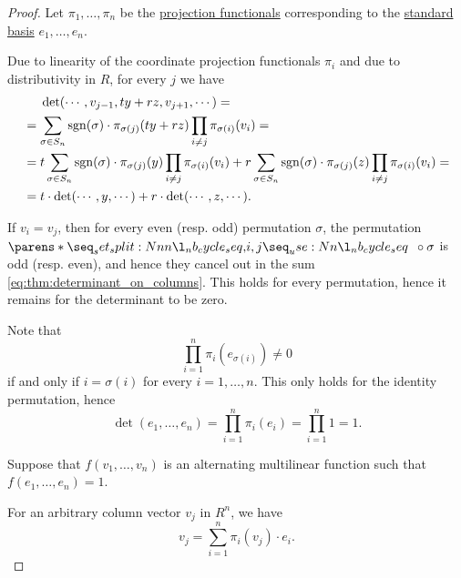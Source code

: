\begin{proof}
  Let \( \pi_1, \ldots, \pi_n \) be the \hyperref[def:basis_decomposition]{projection functionals} corresponding to the \hyperref[def:sequence_space]{standard basis} \( e_1, \ldots, e_n \).

   Due to linearity of the coordinate projection functionals \( \pi_i \) and due to distributivity in \( R \), for every \( j \) we have
  \begin{align*}
    &\phantom{{}={}}
    \det(\cdots, v_{j-1}, ty + rz, v_{j+1}, \cdots)
    = \\ &=
    \sum_{\sigma \in S_n} \sgn(\sigma) \cdot \pi_{\sigma(j)} (ty + rz) \prod_{i \neq j} \pi_{\sigma(i)} (v_i)
    = \\ &=
    t \sum_{\sigma \in S_n} \sgn(\sigma) \cdot \pi_{\sigma(j)} (y) \prod_{i \neq j} \pi_{\sigma(i)} (v_i) + r \sum_{\sigma \in S_n} \sgn(\sigma) \cdot \pi_{\sigma(j)} (z) \prod_{i \neq j} \pi_{\sigma(i)} (v_i)
    = \\ &=
    t \cdot \det(\cdots, y, \cdots) + r \cdot \det(\cdots, z, \cdots).
  \end{align*}

   If \( v_i = v_j \), then for every even (resp. odd) permutation \( \sigma \), the permutation \( \cycle{i, j} \bincirc \sigma \) is odd (resp. even), and hence they cancel out in the sum \eqref{eq:thm:determinant_on_columns}. This holds for every permutation, hence it remains for the determinant to be zero.

   Note that
  \begin{equation*}
    \prod_{i=1}^n \pi_i (e_{\sigma(i)}) \neq 0
  \end{equation*}
  if and only if \( i = \sigma(i) \) for every \( i = 1, \ldots, n \). This only holds for the identity permutation, hence
  \begin{equation*}
    \det(e_1, \ldots, e_n) = \prod_{i=1}^n \pi_i(e_i) = \prod_{i=1}^n 1 = 1.
  \end{equation*}

  \UniquenessSubProof Suppose that \( f(v_1, \ldots, v_n) \) is an alternating multilinear function such that \( f(e_1, \ldots, e_n) = 1 \).

  For an arbitrary column vector \( v_j \) in \( R^n \), we have
  \begin{equation*}
    v_j = \sum_{i=1}^n \pi_i(v_j) \cdot e_i.
  \end{equation*}


\end{proof}
